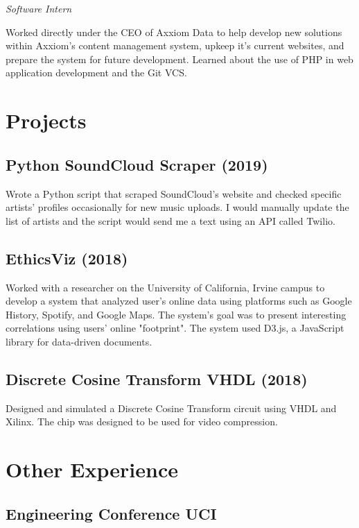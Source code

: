 \documentclass{article}
\begin{document}
\noindent\textit{Software Intern}

Worked directly under the CEO of Axxiom Data to help develop new solutions within Axxiom's
content management system, upkeep it's current websites, and prepare the system for future development. Learned about 
the use of PHP in web application development and the Git VCS.

\section{Projects}

\subsection{Python SoundCloud Scraper (2019)}

Wrote a Python script that scraped SoundCloud's website and checked specific artists' profiles occasionally for new music uploads. 
I would manually update the list of artists and the script would send me a text using an API called Twilio.

\subsection{EthicsViz (2018)}

Worked with a researcher on the University of California, Irvine campus to develop a system that analyzed 
user's online data using platforms such as Google History, Spotify, and Google Maps. The system's goal was to present interesting correlations using users' online "footprint".  The system used D3.js, a JavaScript library for data-driven documents. 

\subsection{Discrete Cosine Transform VHDL (2018)}

Designed and simulated a Discrete Cosine Transform circuit using VHDL and Xilinx. The chip was designed to be 
used for video compression. 

\section{Other Experience}

\subsection{Engineering Conference UCI}
\end{document}
